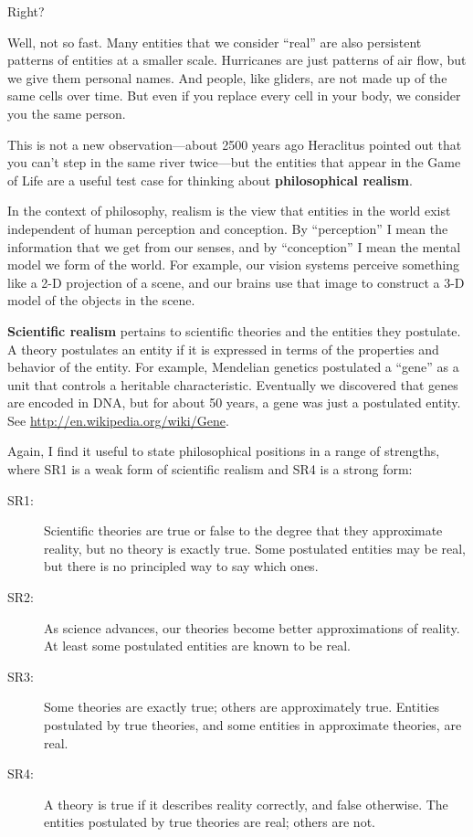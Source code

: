 \documentclass[10pt]{book}
\begin{document}
Right?

Well, not so fast.  Many entities that we consider ``real'' are also
persistent patterns of entities at a smaller scale.  Hurricanes are
just patterns of air flow, but we give them personal names.  And
people, like gliders, are not made up of the same cells over time.
But even if you replace every cell in your body, we consider you the
same person.

This is not a new observation---about 2500 years ago Heraclitus
pointed out that you can't step in the same river twice---but the
entities that appear in the Game of Life are a useful test case for
thinking about {\bf philosophical realism}.

In the context of philosophy, realism is the view that entities
in the world exist independent of human perception and conception.
By ``perception'' I mean the information that we get from
our senses, and by ``conception'' I mean the mental model
we form of the world.  For example, our vision systems perceive
something like a 2-D projection of a scene, and our brains
use that image to construct a 3-D model of the objects in the
scene.

{\bf Scientific realism} pertains to scientific theories and the
entities they postulate.
A theory postulates an entity if it is
expressed in terms of the properties and behavior of the entity.  For
example, Mendelian genetics postulated a ``gene'' as a unit that
controls a heritable characteristic.  Eventually we discovered that
genes are encoded in DNA, but for about 50 years, a gene was just a
postulated entity.  See \url{http://en.wikipedia.org/wiki/Gene}.

Again, I find it useful to state philosophical positions in a range of
strengths, where SR1 is a weak form of scientific realism and SR4 is a
strong form:

\begin{description}

\item[SR1:] Scientific theories are true or false to the degree that
  they approximate reality, but no theory is exactly true.  Some
  postulated entities may be real, but there is no principled way to
  say which ones.

\item[SR2:] As science advances, our theories become better
  approximations of reality.  At least some postulated entities are
  known to be real.

\item[SR3:] Some theories are exactly true; others are approximately
  true.  Entities postulated by true theories, and some entities
  in approximate theories, are real.

\item[SR4:] A theory is true if it describes reality correctly, and
  false otherwise.  The entities postulated by true theories are real;
  others are not.

\end{description}
\end{document}
